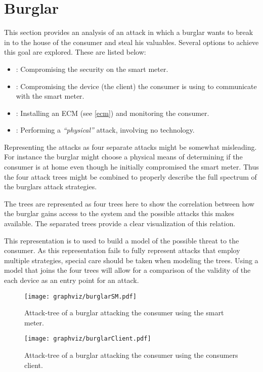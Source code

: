 \section{Burglar}
This section provides an analysis of an attack in which a burglar wants to break in to the house of the consumer and steal his valuables.
Several options to achieve this goal are explored.
These are listed below:
\begin{itemize}
  \item {}: Compromising the security on the smart meter.
  \item {}: Compromising the device (the client) the consumer is using to communicate with the smart meter.
  \item {}: Installing an ECM (see \cref{ecm}) and monitoring the consumer.
  \item {}: Performing a \emph{``physical''} attack, involving no technology.
\end{itemize}

Representing the attacks as four separate attacks might be somewhat misleading.
For instance the burglar might choose a physical means of determining if the consumer is at home even though he initially compromised the smart meter.
Thus the four attack trees might be combined to properly describe the full spectrum of the burglars attack strategies.

The trees are represented as four trees here to show the correlation between how the burglar gains access to the system and the possible attacks this makes available.
The separated trees provide a clear visualization of this relation.

This representation is to used to build a model of the possible threat to the consumer.
As this representation fails to fully represent attacks that employ multiple strategies, special care should be taken when modeling the trees.
Using a model that joins the four trees will allow for a comparison of the validity of the each device as an entry point for an attack.

\begin{figure}
\center
\texttt{[image: graphviz/burglarSM.pdf]}
\caption{Attack-tree of a burglar attacking the consumer using the smart meter.}
\label{attacktree:burglar:sm}
\end{figure}

\begin{figure}
\center
\texttt{[image: graphviz/burglarClient.pdf]}
\caption{Attack-tree of a burglar attacking the consumer using the consumers client.}
\label{attacktree:burglar:client}
\end{figure}

